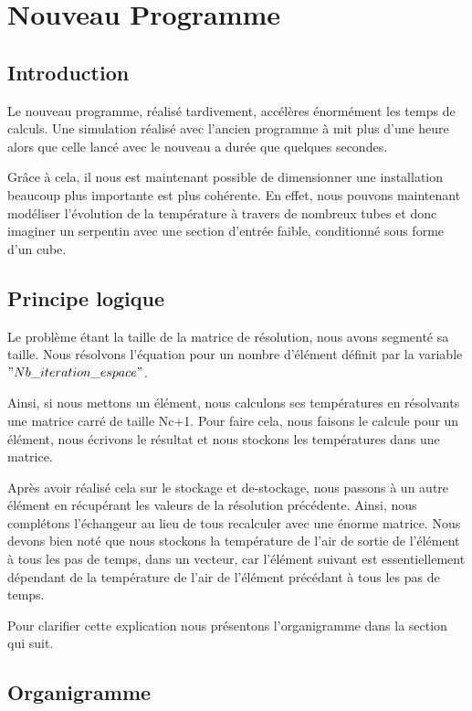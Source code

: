 \section{Nouveau Programme}

\subsection{Introduction}

Le nouveau programme, réalisé tardivement, accélères énormément les temps de calculs. Une simulation réalisé avec l'ancien programme à mit plus d'une heure alors que celle lancé avec le nouveau a durée que quelques secondes.

Grâce à cela, il nous est maintenant possible de dimensionner une installation beaucoup plus importante est plus cohérente. En effet, nous pouvons maintenant modéliser l'évolution de la température à travers de nombreux tubes et donc imaginer un serpentin avec une section d'entrée faible, conditionné sous forme d'un cube.

\subsection{Principe logique}

Le problème étant la taille de la matrice de résolution, nous avons segmenté sa taille. Nous résolvons l'équation pour un nombre d'élément définit par la variable $"Nb\_iteration\_espace"$.

 Ainsi, si nous mettons un élément, nous calculons ses températures en résolvants une matrice carré de taille Nc+1. Pour faire cela, nous faisons le calcule pour un élément, nous écrivons le résultat et nous stockons les températures dans une matrice. 
 
 Après avoir réalisé cela sur le stockage et de-stockage, nous passons à un autre élément en récupérant les valeurs de la résolution précédente. Ainsi, nous complétons l'échangeur au lieu de tous recalculer avec une énorme matrice. Nous devons bien noté que nous stockons la température de l'air de sortie de l'élément à tous les pas de temps, dans un vecteur, car l'élément suivant est essentiellement dépendant de la température de l'air de l'élément précédant à tous les pas de temps. 

Pour clarifier cette explication nous présentons l'organigramme dans la section qui suit.

\newpage
\subsection{Organigramme}

